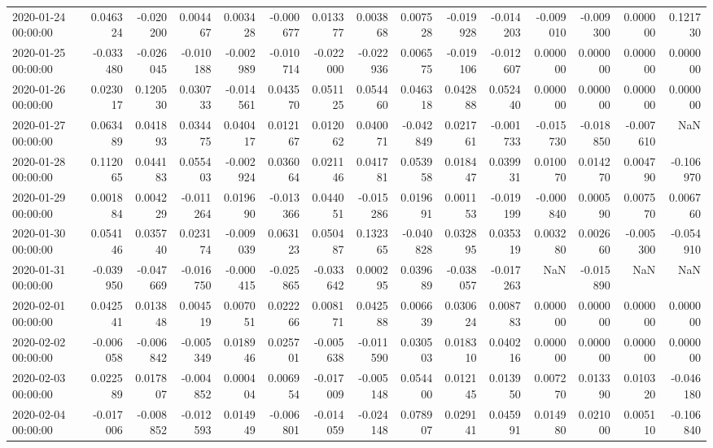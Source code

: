 \begin{tabular}{lrrrrrrrrrrrrrr}
2020-01-24 00:00:00 & 0.046324 & -0.020200 & 0.004467 & 0.003428 & -0.000677 & 0.013377 & 0.003868 & 0.007528 & -0.019928 & -0.014203 & -0.009010 & -0.009300 & 0.000000 & 0.121730 \\
2020-01-25 00:00:00 & -0.033480 & -0.026045 & -0.010188 & -0.002989 & -0.010714 & -0.022000 & -0.022936 & 0.006575 & -0.019106 & -0.012607 & 0.000000 & 0.000000 & 0.000000 & 0.000000 \\
2020-01-26 00:00:00 & 0.023017 & 0.120530 & 0.030733 & -0.014561 & 0.043570 & 0.051125 & 0.054460 & 0.046318 & 0.042888 & 0.052440 & 0.000000 & 0.000000 & 0.000000 & 0.000000 \\
2020-01-27 00:00:00 & 0.063489 & 0.041893 & 0.034475 & 0.040417 & 0.012167 & 0.012062 & 0.040071 & -0.042849 & 0.021761 & -0.001733 & -0.015730 & -0.018850 & -0.007610 & NaN \\
2020-01-28 00:00:00 & 0.112065 & 0.044183 & 0.055403 & -0.002924 & 0.036064 & 0.021146 & 0.041781 & 0.053958 & 0.018447 & 0.039931 & 0.010070 & 0.014270 & 0.004790 & -0.106970 \\
2020-01-29 00:00:00 & 0.001884 & 0.004229 & -0.011264 & 0.019690 & -0.013366 & 0.044051 & -0.015286 & 0.019691 & 0.001153 & -0.019199 & -0.000840 & 0.000590 & 0.007570 & 0.006760 \\
2020-01-30 00:00:00 & 0.054146 & 0.035740 & 0.023174 & -0.009039 & 0.063123 & 0.050487 & 0.132365 & -0.040828 & 0.032895 & 0.035319 & 0.003280 & 0.002660 & -0.005300 & -0.054910 \\
2020-01-31 00:00:00 & -0.039950 & -0.047669 & -0.016750 & -0.000415 & -0.025865 & -0.033642 & 0.000295 & 0.039689 & -0.038057 & -0.017263 & NaN & -0.015890 & NaN & NaN \\
2020-02-01 00:00:00 & 0.042541 & 0.013848 & 0.004519 & 0.007051 & 0.022266 & 0.008171 & 0.042588 & 0.006639 & 0.030624 & 0.008783 & 0.000000 & 0.000000 & 0.000000 & 0.000000 \\
2020-02-02 00:00:00 & -0.006058 & -0.006842 & -0.005349 & 0.018946 & 0.025701 & -0.005638 & -0.011590 & 0.030503 & 0.018310 & 0.040216 & 0.000000 & 0.000000 & 0.000000 & 0.000000 \\
2020-02-03 00:00:00 & 0.022589 & 0.017807 & -0.004852 & 0.000404 & 0.006954 & -0.017009 & -0.005148 & 0.054400 & 0.012145 & 0.013950 & 0.007270 & 0.013390 & 0.010320 & -0.046180 \\
2020-02-04 00:00:00 & -0.017006 & -0.008852 & -0.012593 & 0.014949 & -0.006801 & -0.014059 & -0.024148 & 0.078907 & 0.029141 & 0.045991 & 0.014980 & 0.021000 & 0.005110 & -0.106840 \\

\end{tabular}
